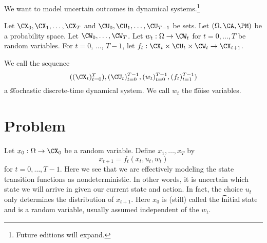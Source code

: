 

We want to model uncertain outcomes in dynamical systems.\footnote{Future editions will expand.}


Let $\CX_0, \CX_1, \dots, \CX_{T}$ and $\CU_0, \CU_1, \dots, \CU_{T-1}$ be sets.
Let $(\Omega, \CA, \PM)$ be a probability space.
Let $\CW_{0}, \dots, \CW_{T}$.
Let $w_{t}: \Omega \to \CW_{t}$ for $t = 0, \dots, T$ be random variables.
For $t = 0$, $\dots$, $T-1$, let $f_{t}: \CX_t \times \CU_t \times \CW_t \to \CX_{t+1}$.

We call the sequence
\[
	((\CX_t)_{t = 0}^{T}), (\CU_t)_{t=0}^{T-1}, (w_t)_{t=0}^{T-1}, (f_t)_{t=1}^{T-1})
\]
a \t{stochastic discrete-time dynamical system}.
We call $w_t$ the \t{noise} variables.


\section{Problem}

Let $x_0: \Omega \to \CX_0$ be a random variable.
Define $x_1, \dots, x_T$ by
\[
    x_{t+1} = f_t(x_t, u_t, w_t)
\]
for $t = 0, \dots, T-1$.
Here we see that we are effectively modeling the state transition functions as nondeterministic.
In other words, it is uncertain which state we will arrive in given our current state and action.
In fact, the choice $u_t$ only determines the distribution of $x_{t+1}$.
Here $x_0$ is (still) called the \t{initial state} and is a random variable, usually assumed independent of the $w_t$.


\blankpage
